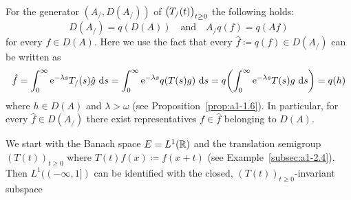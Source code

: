 For the generator $(A_{/}, D(A_{/}))$ of $\mleft(T_{/}(t)\mright)_{t \geq 0}$ the following holds:
\[
    D(A_{/}) = q(D(A)) 
    \quad \text{and} \quad 
    A_{/}q(f) = q(Af)
\]
for every $f \in D(A)$.
Here we use the fact that every $\hat{f} \coloneq q(f) \in D(A_{/})$ can be written as
\[
    \hat{f} = \int_{0}^{\infty} \eu^{-\lambda s} T_{/}(s)\hat{g} \, \ds 
            = \int_{0}^{\infty} \eu^{-\lambda s} q(T(s)g) \, \ds 
            = q\mleft(\int_{0}^{\infty} \eu^{-\lambda s} T(s)g \, \ds\mright) 
            = q(h)
\]
where $h \in D(A)$ and $\lambda > \omega$ (see Proposition~\ref{prop:a1-1.6}).
In particular, for every $\hat{f} \in D(A_{/})$ there exist representatives $f \in \hat{f}$ belonging to $D(A)$.
\begin{example*}\label{ex:a1-3.1}%
%
%
%
We start with the Banach space $E = L^{1}(\mathbb{R})$ and the translation semigroup $(T(t))_{t \geq 0}$ where $T(t)f(x) \coloneq f(x+t)$ (see Example~\ref{subsec:a1-2.4}).
Then $L^{1}((-\infty,1])$ can be identified with the closed, 
$(T(t))_{t \geq 0}$-invariant subspace

\end{example*}
